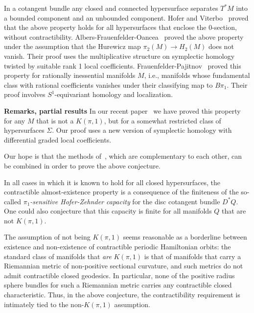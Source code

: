\documentclass[11pt]{article}
\theoremstyle{definition}
\begin{document}
In a cotangent bundle any closed and connected hypersurface separates $T^*M$ into a bounded component and an unbounded component. Hofer and Viterbo~\cite{HV88} proved that the above property holds for all hypersurfaces that enclose the $0$-section, without contractibility. Albers-Frauenfelder-Oancea~\cite{AFO17} proved the above property under the assumption that the Hurewicz map $\pi_2(M)\to H_2(M)$ does not vanish. Their proof uses the multiplicative structure on symplectic homology twisted by suitable rank 1 local coefficients. Frauenfelder-Pajitnov~\cite{Frauenfelder-Pajitnov} proved this property for rationally inessential manifolds $M$, i.e., manifolds whose fundamental class with rational coefficients vanishes under their classifying map to $B\pi_1$. Their proof involves $S^1$-equivariant homology and localization.  

\textbf{Remarks, partial results} 
In our recent paper~\cite{BDHO-cotangent} we have proved this property for any $M$ that is not a $K(\pi,1)$, but for a somewhat restricted class of hypersurfaces $\Sigma$. Our proof uses a new version of symplectic homology with differential graded local coefficients. 
 
Our hope is that the methods of~\cite{AFO17, Frauenfelder-Pajitnov, BDHO-cotangent}, which are complementary to each other, can be combined in order to prove the above conjecture. 
 
In all cases in which it is known to hold for all closed hypersurfaces, the contractible almost-existence property is a consequence of the finiteness of the so-called \emph{$\pi_1$-sensitive Hofer-Zehnder capacity} for the disc cotangent bundle $D^*Q$. One could also conjecture that this capacity is finite for all manifolds $Q$ that are not $K(\pi,1)$.
 
The assumption of not being $K(\pi,1)$ seems reasonable as a borderline between existence and non-existence of contractible periodic Hamiltonian orbits: the standard class of manifolds that \emph{are} $K(\pi,1)$ is that of manifolds that carry a Riemannian metric of non-positive sectional curvature, and such metrics do not admit contractible closed geodesics. In particular, none of the positive radius sphere bundles for such a Riemannian metric carries any contractible closed characteristic. Thus, in the above conjecture, the contractibility requirement is intimately tied to the non-$K(\pi,1)$ assumption.\\
 
\end{document}
